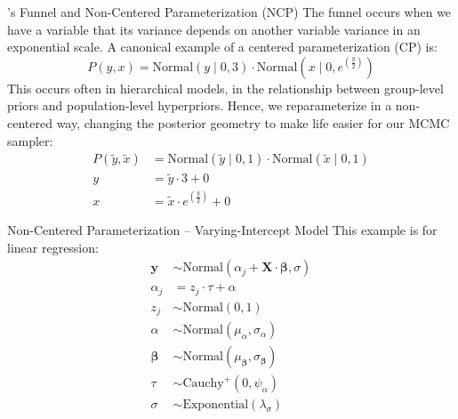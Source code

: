 \begin{frame}{\textcite{nealSliceSampling2003}'s Funnel and Non-Centered Parameterization (NCP)}
	\small
	The funnel occurs when we have a variable that its variance depends on another variable variance
	in an exponential scale.
	A canonical example of a centered parameterization (CP) is:
	$$
		P(y,x) = \text{Normal}(y \mid 0 ,3) \cdot
		\text{Normal}\left(x \mid 0, e^{\left(\frac{y}{2}\right)}\right)
	$$
	This occurs often in hierarchical models,
	in the relationship between group-level priors and population-level hyperpriors.
	Hence, we reparameterize in a non-centered way,
	changing the posterior geometry to make life easier for our MCMC sampler:
	$$
		\begin{aligned}
			P(\tilde{y},\tilde{x}) & = \text{Normal}(\tilde{y} \mid 0, 1) \cdot
			\text{Normal}(\tilde{x} \mid 0, 1)                                           \\
			y                      & = \tilde{y} \cdot 3 + 0                             \\
			x                      & = \tilde{x} \cdot  e^{\left(\frac{y}{2}\right)} + 0
		\end{aligned}
	$$
\end{frame}

\begin{frame}{Non-Centered Parameterization -- Varying-Intercept Model}
	This example is for linear regression:
	$$
		\begin{aligned}
			\mathbf{y}         & \sim \text{Normal}\left(\alpha_j + \mathbf{X} \cdot \boldsymbol{\beta}, \sigma \right) \\
			\alpha_j           & = z_j \cdot \tau + \alpha                                                              \\
			z_j                & \sim \text{Normal}(0, 1)                                                               \\
			\alpha             & \sim \text{Normal}(\mu_\alpha, \sigma_\alpha)                                          \\
			\boldsymbol{\beta} & \sim \text{Normal}(\mu_{\boldsymbol{\beta}}, \sigma_{\boldsymbol{\beta}})              \\
			\tau               & \sim \text{Cauchy}^+(0, \psi_{\alpha})                                                 \\
			\sigma             & \sim \text{Exponential}(\lambda_\sigma)
		\end{aligned}
	$$
\end{frame}

